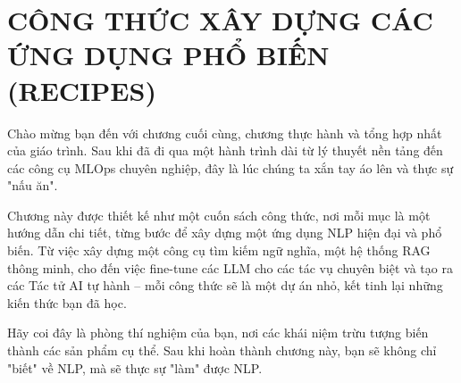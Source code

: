 
\chapter{CÔNG THỨC XÂY DỰNG CÁC ỨNG DỤNG PHỔ BIẾN (RECIPES)}
\label{chap:recipes}

Chào mừng bạn đến với chương cuối cùng, chương thực hành và tổng hợp nhất của giáo trình. Sau khi đã đi qua một hành trình dài từ lý thuyết nền tảng đến các công cụ MLOps chuyên nghiệp, đây là lúc chúng ta xắn tay áo lên và thực sự "nấu ăn".

Chương này được thiết kế như một cuốn sách công thức, nơi mỗi mục là một hướng dẫn chi tiết, từng bước để xây dựng một ứng dụng NLP hiện đại và phổ biến. Từ việc xây dựng một công cụ tìm kiếm ngữ nghĩa, một hệ thống RAG thông minh, cho đến việc fine-tune các LLM cho các tác vụ chuyên biệt và tạo ra các Tác tử AI tự hành -- mỗi công thức sẽ là một dự án nhỏ, kết tinh lại những kiến thức bạn đã học.

Hãy coi đây là phòng thí nghiệm của bạn, nơi các khái niệm trừu tượng biến thành các sản phẩm cụ thể. Sau khi hoàn thành chương này, bạn sẽ không chỉ "biết" về NLP, mà sẽ thực sự "làm" được NLP.